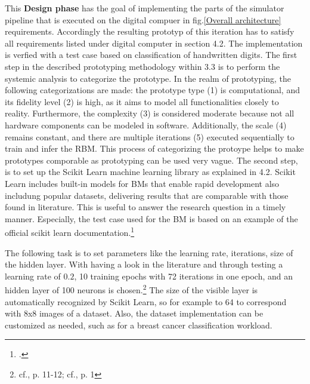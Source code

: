 This \textbf{Design phase} has the goal of implementing the parts of the simulator pipeline that is executed 
on the digital compuer in fig.\ref{Overall architecture} requirements.
Accordingly the resulting prototyp of this iteration has to satisfy all requirements listed under digital computer in section 4.2.
The implementation is verfied with a test case based on classification of handwritten digits.
The first step in the described prototyping methodology within 3.3 is to perform the systemic analysis to categorize the prototype.
In the realm of prototyping, the following categorizations are made: the prototype type (1) is computational, and its fidelity level (2) is high, as it aims to model all functionalities closely to reality.
Furthermore, the complexity (3) is considered moderate because not all hardware components can be modeled in software.
Additionally, the scale (4) remains constant, and there are multiple iterations (5) executed sequentially to train and infer the \ac{RBM}.
This process of categorizing the protoype helps to make prototypes comporable as prototyping can be used very vague.
The second step, is to set up the Scikit Learn machine learning library as explained in 4.2.
Scikit Learn includes built-in models for \ac{BM}s that enable rapid development also includung popular datasets, delivering results that are comparable with those found in literature.
This is useful to answer the research question in a timely manner.
Especially, the test case used for the \ac{BM} is based on an example of the official scikit learn documentation.\footcite[cf.][1]{RestrictedBoltzmannMachine}

The following task is to set parameters like the learning rate, iterations, size of the hidden layer. 
With having a look in the literature and through testing a learning rate of \(0.2\), 10 training epochs with 72 iterations in one epoch, and an hidden layer of 100 neurons is chosen.\footnote{cf.\cite{hintonPracticalGuideTraining2012}, p. 11-12; cf.\cite{bohmNoiseinjectedAnalogIsing2022}, p. 1}
The size of the visible layer is automatically recognized by Scikit Learn, so for example to 64 to correspond with 8x8 images of a dataset.
Also, the dataset implementation can be customized as needed, such as for a breast cancer classification workload.

